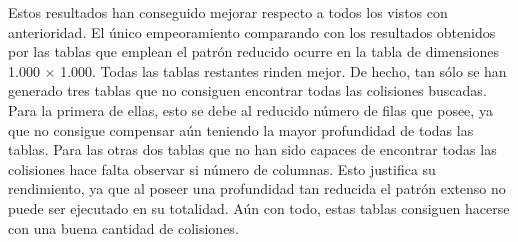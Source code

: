 \documentclass[12pt,spanish,listoffigures,listoftables,listofalgorithms]{tfgetsinf}
\begin{document}
\def\arraystretch{1.5}
\begin{table}[H]
	\LARGE
	\centering
	\caption{Porcentajes de éxito para las tablas empleando el patrón extenso}
	\label{resPG}
\end{table}

Estos resultados han conseguido mejorar respecto a todos los vistos con anterioridad. El único empeoramiento comparando con los resultados obtenidos por las tablas que emplean el patrón reducido ocurre en la tabla de dimensiones 1.000 $\times$ 1.000. Todas las tablas restantes rinden mejor. De hecho, tan sólo se han generado tres tablas que no consiguen encontrar todas las colisiones buscadas. Para la primera de ellas, esto se debe al reducido número de filas que posee, ya que no consigue compensar aún teniendo la mayor profundidad de todas las tablas. Para las otras dos tablas que no han sido capaces de encontrar todas las colisiones hace falta observar si número de columnas. Esto justifica su rendimiento, ya que al poseer una profundidad tan reducida el patrón extenso no puede ser ejecutado en su totalidad. Aún con todo, estas tablas consiguen hacerse con una buena cantidad de colisiones.
\end{document}
